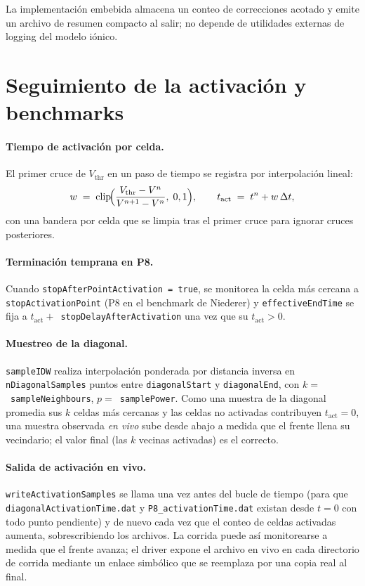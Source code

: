 \documentclass[11pt,a4paper]{article}
\newcommand{\code}[1]{\texttt{\small #1}}
\begin{document}
La implementación embebida almacena un conteo de correcciones acotado y emite un
archivo de resumen compacto al salir; no depende de utilidades externas de logging
del modelo iónico.

\section{Seguimiento de la activación y benchmarks}

\paragraph{Tiempo de activación por celda.}
El primer cruce de $V_{\text{thr}}$ en un paso de tiempo se registra por
interpolación lineal:
\begin{equation}
  w \;=\; \mathrm{clip}\!\Bigl(
      \frac{V_{\text{thr}} - V^{n}}{V^{n+1} - V^{n}},
      \; 0, 1
    \Bigr),
   \qquad
   t_{\text{act}} \;=\; t^{n} + w\, \Delta t,
\end{equation}
con una bandera por celda que se limpia tras el primer cruce para ignorar cruces
posteriores.

\paragraph{Terminación temprana en P8.}
Cuando \code{stopAfterPointActivation = true}, se monitorea la celda más cercana a
\code{stopActivationPoint} (P8 en el benchmark de Niederer) y \code{effectiveEndTime}
se fija a $t_{\text{act}} + $~\code{stopDelayAfterActivation} una vez que su
$t_{\text{act}} > 0$.

\paragraph{Muestreo de la diagonal.}
\code{sampleIDW} realiza interpolación ponderada por distancia inversa en
\code{nDiagonalSamples} puntos entre \code{diagonalStart} y \code{diagonalEnd}, con
$k = $~\code{sampleNeighbours}, $p = $~\code{samplePower}. Como una muestra de la
diagonal promedia sus $k$ celdas más cercanas y las celdas no activadas contribuyen
$t_{\text{act}}=0$, una muestra observada \emph{en vivo} sube desde abajo a medida
que el frente llena su vecindario; el valor final (las $k$ vecinas activadas) es el
correcto.

\paragraph{Salida de activación en vivo.}
\code{writeActivationSamples} se llama una vez antes del bucle de tiempo (para que
\code{diagonalActivationTime.dat} y \code{P8\_activationTime.dat} existan desde $t=0$
con todo punto pendiente) y de nuevo cada vez que el conteo de celdas activadas
aumenta, sobrescribiendo los archivos. La corrida puede así monitorearse a medida
que el frente avanza; el driver expone el archivo en vivo en cada directorio de
corrida mediante un enlace simbólico que se reemplaza por una copia real al final.
\end{document}
